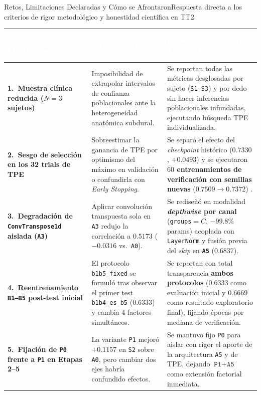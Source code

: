 \begin{frame}{Retos, Limitaciones Declaradas y C\'omo se Afrontaron}{Respuesta directa a los criterios de rigor metodol\'ogico y honestidad cient\'ifica en TT2}
  \scriptsize
  \centering
  \renewcommand{\arraystretch}{1.28}
  \setlength{\tabcolsep}{4.5pt}
  \begin{tabular}{@{} p{3.4cm} p{4.6cm} p{5.4cm} @{}}
    \toprule
    \rowcolor{ipnDark}
    \textcolor{white}{\textbf{Reto o Limitaci\'on Identificada}} &
    \textcolor{white}{\textbf{Riesgo Metodol\'ogico Asociado}} &
    \textcolor{white}{\textbf{C\'omo se Afront\'o en el Trabajo Terminal}} \\
    \midrule
    \textbf{1.\ Muestra cl\'inica reducida ($N=3$ sujetos)} & Imposibilidad de extrapolar intervalos de confianza poblacionales ante la heterogeneidad anat\'omica subdural. & Se reportan todas las m\'etricas desglosadas por sujeto (\texttt{S1--S3}) y por dedo sin hacer inferencias poblacionales infundadas, ejecutando b\'usqueda TPE individualizada. \\
    \rowcolor{rowLight}
    \textbf{2.\ Sesgo de selecci\'on en los 32 trials de TPE} & Sobreestimar la ganancia de TPE por optimismo del m\'aximo en validaci\'on o confundirla con \textit{Early Stopping}. & Se separ\'o el efecto del \textit{checkpoint} hist\'orico ($0.7330$, $+0.0493$) y se ejecutaron \textbf{$60$ entrenamientos de verificaci\'on con semillas nuevas} ($0.7509 \to 0.7372$) \cite{cawley2010overfitting}. \\
    \textbf{3.\ Degradaci\'on de \texttt{ConvTranspose1d} aislada (\texttt{A3})} & Aplicar convoluci\'on transpuesta sola en \texttt{A3} redujo la correlaci\'on a $0.5173$ ($-0.0316$ vs.\ \texttt{A0}). & Se redise\~n\'o en modalidad \textbf{\textit{depthwise} por canal} (\texttt{groups}$=C$, $-99.8\%$ params) acoplada con \texttt{LayerNorm} y fusi\'on previa del \textit{skip} en \textbf{\texttt{A5}} ($0.6837$). \\
    \rowcolor{rowLight}
    \textbf{4.\ Reentrenamiento \texttt{B1--B5} post-test inicial} & El protocolo \texttt{b1b5\_fixed} se formul\'o tras observar el primer test \texttt{b1b4\_es\_b5} ($0.6333$) y cambia 4 factores simult\'aneos. & Se reportan con total transparencia \textbf{ambos protocolos} ($0.6333$ como evaluaci\'on inicial y $0.6669$ como resultado exploratorio final), fijando \'epocas por mediana de verificaci\'on. \\
    \textbf{5.\ Fijaci\'on de \texttt{P0} frente a \texttt{P1} en Etapas 2--5} & La variante \texttt{P1} mejor\'o $+0.1157$ en \texttt{S2} sobre \texttt{A0}, pero cambiar dos ejes habr\'ia confundido efectos. & Se mantuvo fijo \texttt{P0} para aislar con rigor el aporte de la arquitectura \texttt{A5} y de TPE, dejando $\texttt{P1}+\texttt{A5}$ como extensi\'on factorial inmediata. \\
    \bottomrule
  \end{tabular}
\end{frame}

